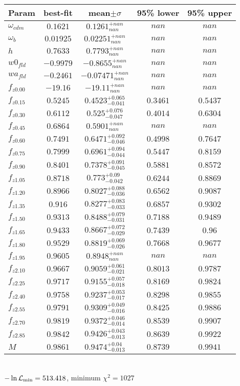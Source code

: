 \begin{tabular}{|l|c|c|c|c|} 
 \hline 
Param & best-fit & mean$\pm\sigma$ & 95\% lower & 95\% upper \\ \hline 
$\omega_{cdm }$ &$0.1621$ & $0.1261_{nan}^{+nan}$ & $nan$ & $nan$ \\ 
$\omega_{b }$ &$0.01925$ & $0.02251_{nan}^{+nan}$ & $nan$ & $nan$ \\ 
$h$ &$0.7633$ & $0.7793_{nan}^{+nan}$ & $nan$ & $nan$ \\ 
$w0_{fld }$ &$-0.9979$ & $-0.8655_{nan}^{+nan}$ & $nan$ & $nan$ \\ 
$wa_{fld }$ &$-0.2461$ & $-0.07471_{nan}^{+nan}$ & $nan$ & $nan$ \\ 
$f_{z0.00 }$ &$-19.16$ & $-19.11_{nan}^{+nan}$ & $nan$ & $nan$ \\ 
$f_{z0.15 }$ &$0.5245$ & $0.4523_{-0.041}^{+0.065}$ & $0.3461$ & $0.5437$ \\ 
$f_{z0.30 }$ &$0.6112$ & $0.525_{-0.047}^{+0.076}$ & $0.4014$ & $0.6304$ \\ 
$f_{z0.45 }$ &$0.6864$ & $0.5901_{nan}^{+nan}$ & $nan$ & $nan$ \\ 
$f_{z0.60 }$ &$0.7491$ & $0.6471_{-0.046}^{+0.092}$ & $0.4998$ & $0.7647$ \\ 
$f_{z0.75 }$ &$0.7999$ & $0.6961_{-0.044}^{+0.094}$ & $0.5447$ & $0.8159$ \\ 
$f_{z0.90 }$ &$0.8401$ & $0.7378_{-0.045}^{+0.091}$ & $0.5881$ & $0.8572$ \\ 
$f_{z1.05 }$ &$0.8718$ & $0.773_{-0.042}^{+0.09}$ & $0.6244$ & $0.8869$ \\ 
$f_{z1.20 }$ &$0.8966$ & $0.8027_{-0.036}^{+0.088}$ & $0.6562$ & $0.9087$ \\ 
$f_{z1.35 }$ &$0.916$ & $0.8277_{-0.033}^{+0.083}$ & $0.6857$ & $0.9302$ \\ 
$f_{z1.50 }$ &$0.9313$ & $0.8488_{-0.031}^{+0.079}$ & $0.7188$ & $0.9489$ \\ 
$f_{z1.65 }$ &$0.9433$ & $0.8667_{-0.029}^{+0.072}$ & $0.7439$ & $0.96$ \\ 
$f_{z1.80 }$ &$0.9529$ & $0.8819_{-0.026}^{+0.069}$ & $0.7668$ & $0.9677$ \\ 
$f_{z1.95 }$ &$0.9605$ & $0.8948_{nan}^{+nan}$ & $nan$ & $nan$ \\ 
$f_{z2.10 }$ &$0.9667$ & $0.9059_{-0.021}^{+0.061}$ & $0.8013$ & $0.9787$ \\ 
$f_{z2.25 }$ &$0.9717$ & $0.9155_{-0.018}^{+0.057}$ & $0.8169$ & $0.9824$ \\ 
$f_{z2.40 }$ &$0.9758$ & $0.9237_{-0.017}^{+0.053}$ & $0.8298$ & $0.9855$ \\ 
$f_{z2.55 }$ &$0.9791$ & $0.9309_{-0.016}^{+0.049}$ & $0.8425$ & $0.9886$ \\ 
$f_{z2.70 }$ &$0.9819$ & $0.9372_{-0.014}^{+0.046}$ & $0.8539$ & $0.9907$ \\ 
$f_{z2.85 }$ &$0.9842$ & $0.9426_{-0.013}^{+0.043}$ & $0.8639$ & $0.9922$ \\ 
$M$ &$0.9861$ & $0.9474_{-0.013}^{+0.04}$ & $0.8739$ & $0.9941$ \\ 
\hline 
 \end{tabular} \\ 
$-\ln{\cal L}_\mathrm{min} =513.418$, minimum $\chi^2=1027$ \\ 
